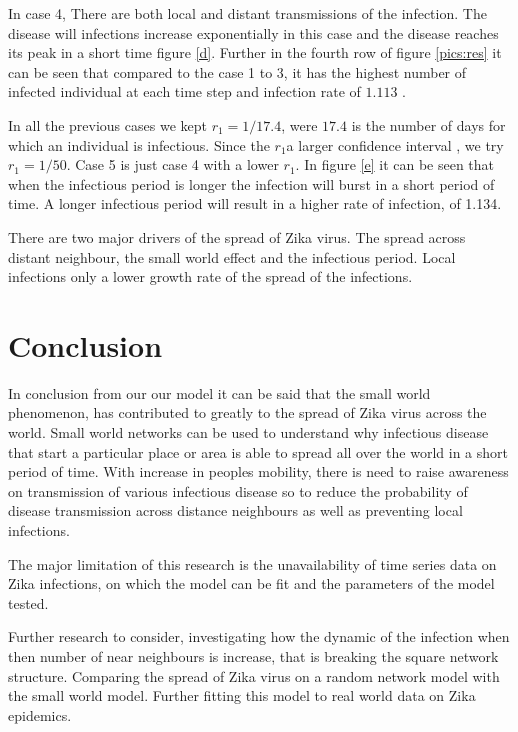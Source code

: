 In case 4, There are both local and distant transmissions of the infection. The disease will infections increase exponentially in this case and the disease reaches its peak in a short time figure \ref{d}. Further in the fourth row of figure \ref{pics:res} it can be seen that compared to the case 1 to 3, it has the highest number of infected individual at each time step and infection rate of $1.113$ .

In all the previous cases we kept $r_1 = 1/17.4$, were $17.4$ is the number of days for which an individual is infectious. Since the $r_1$a larger confidence interval \citep{lessler2016times}, we try  $r_1 = 1/50$. Case 5 is just case 4 with a lower $r_1$. In figure \ref{e} it can be seen that when the infectious period is longer the infection will burst in a short period of time. A longer infectious period will result in a higher rate of infection, of 1.134.

There are two major drivers of the spread of Zika virus. The spread across distant neighbour, the small world effect and the infectious period. Local infections only a lower growth rate of the spread of the infections.


\section{Conclusion}

In conclusion from our our model it can be said that the small world phenomenon, has contributed to greatly to the spread of Zika virus across the world.
Small world networks can be used to understand why infectious disease that start
a particular place or area is able to spread all over the world in a short period of time. With increase in peoples
mobility, there is need to raise awareness on transmission of various infectious disease
so to reduce the probability of disease transmission across distance
neighbours
as well as preventing local infections.

The major limitation of this research is the unavailability of time series data on Zika infections, on which the model can be fit and the parameters of the model tested.

Further research to consider, investigating how the dynamic of the infection when then number of near neighbours is increase, that is breaking the square network structure. Comparing the spread of Zika virus on a random network model with the small world model. Further fitting this model to real world data on Zika epidemics.
